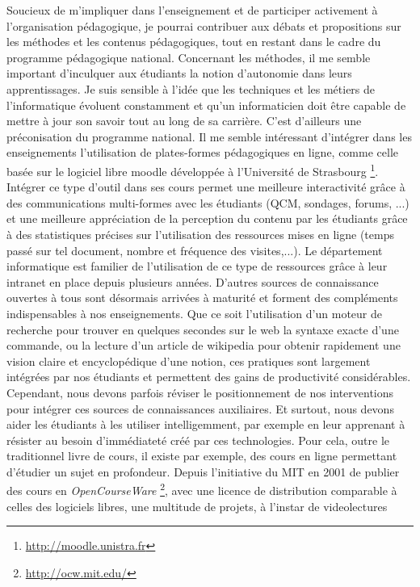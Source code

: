 \documentclass[11pt]{article}
\begin{document}
Soucieux de m'impliquer dans l'enseignement et de participer activement à l'organisation
pédagogique, je pourrai contribuer aux débats et propositions sur les méthodes et les contenus 
pédagogiques, tout en restant dans le cadre du programme pédagogique national.
Concernant les méthodes, il me semble important d'inculquer aux étudiants la notion d'autonomie
dans leurs apprentissages. Je suis sensible à l'idée que les techniques et les métiers de 
l'informatique évoluent constamment et qu'un informaticien doit être capable de mettre à jour
son savoir tout au long de sa carrière. C'est d'ailleurs une préconisation du programme
national. Il me semble intéressant d'intégrer dans les 
enseignements l'utilisation de plates-formes pédagogiques en ligne, comme celle basée sur le 
logiciel libre moodle développée à l'Université de Strasbourg%
\footnote{\url{http://moodle.unistra.fr}}. 
Intégrer ce type d'outil dans ses cours permet une meilleure interactivité grâce à des
communications multi-formes avec les étudiants (QCM, sondages, forums, ...) et une meilleure
appréciation de la perception du contenu par les étudiants grâce à des statistiques précises
sur l'utilisation des ressources mises en ligne (temps passé sur tel document, nombre et
fréquence des visites,...). Le département informatique est familier de l'utilisation de
ce type de ressources grâce à leur intranet en place depuis plusieurs années.
D'autres sources de connaissance ouvertes à tous sont désormais arrivées à maturité et 
forment des compléments indispensables à nos enseignements.
Que ce soit l'utilisation d'un moteur de recherche pour trouver en quelques secondes 
sur le web la syntaxe exacte d'une commande, ou la lecture d'un article de wikipedia
pour obtenir rapidement une vision claire et encyclopédique d'une notion, ces pratiques sont
largement intégrées par nos étudiants et permettent des gains de productivité considérables.
Cependant, nous devons parfois réviser le positionnement de nos interventions pour intégrer 
ces sources de connaissances auxiliaires. Et surtout, nous devons aider les étudiants à les 
utiliser intelligemment, par exemple en leur apprenant à résister au besoin d'immédiateté 
créé par ces technologies. Pour cela, outre le traditionnel livre de cours, il existe par 
exemple, des cours en ligne permettant d'étudier un sujet en profondeur. Depuis l'initiative
du MIT en 2001 de publier des cours en \textit{OpenCourseWare}%
\footnote{\url{http://ocw.mit.edu/}}, avec une licence de distribution comparable à celles
des logiciels libres, une multitude de projets, à l'instar de videolectures%
\end{document}
